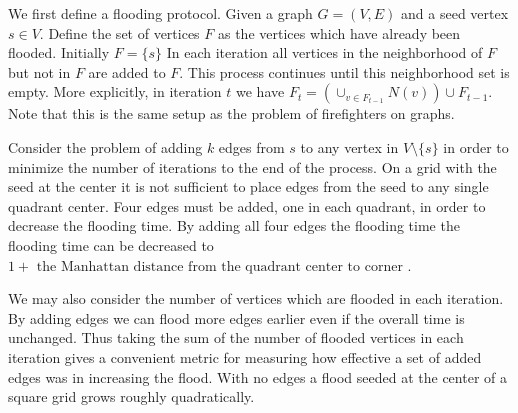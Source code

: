 \documentclass{article}
\begin{document}
We first define a flooding protocol.
Given a graph $G=(V, E)$ and a seed vertex $s \in V$. Define the set of vertices $F$ as the vertices which have already been flooded.
Initially $F = \{ s \}$
In each iteration all vertices in the neighborhood of $F$ but not in $F$ are added to $F$. This process continues until this neighborhood set is empty.
More explicitly, in iteration $t$ we have $F_t = (\cup_{v \in F_{t - 1}} N(v)) \cup F_{t - 1}$.
Note that this is the same setup as the problem of firefighters on graphs.

Consider the problem of adding $k$ edges from $s$ to any vertex in $V \setminus \{s\}$ in order to minimize the number of iterations to the end of the process.
On a grid with the seed at the center it is not sufficient to place edges from the seed to any single quadrant center.
Four edges must be added, one in each quadrant, in order to decrease the flooding time.
By adding all four edges the flooding time the flooding time can be decreased to $1 + \text{ the Manhattan distance from the quadrant center to corner }$.

We may also consider the number of vertices which are flooded in each iteration.
By adding edges we can flood more edges earlier even if the overall time is unchanged.
Thus taking the sum of the number of flooded vertices in each iteration gives a convenient metric for measuring how effective a set of added edges was in increasing the flood.
With no edges a flood seeded at the center of a square grid grows roughly quadratically.
\end{document}
